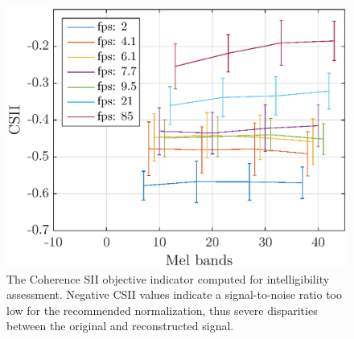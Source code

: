 \documentclass[final,3p,times,twocolumn]{elsarticle}
\newcommand{\ml}[1]{\textcolor{blue}{ Mathieu: #1}}
\begin{document}


\begin{figure}[htbp]
	\centering
		\includegraphics[width=\columnwidth]{figures/csii_mel_avg.eps}
	\caption{The Coherence SII objective indicator computed for intelligibility assessment. Negative CSII values indicate a signal-to-noise ratio too low for the recommended normalization, thus severe disparities between the original and reconstructed signal.}
	\label{fig:csii_mel_avg}
\end{figure}
\end{document}
